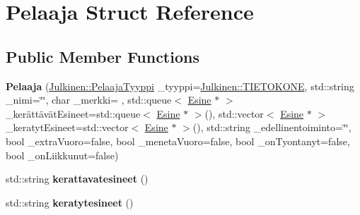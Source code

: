 \hypertarget{struct_pelaaja}{}\section{Pelaaja Struct Reference}
\label{struct_pelaaja}
\subsection*{Public Member Functions}
\begin{DoxyCompactItemize}
\item 
\hypertarget{struct_pelaaja_a278f63f50df4d765e6f0d9f7f69cb369}{}{\bfseries Pelaaja} (\hyperlink{namespace_julkinen_ad9a0a9e01af78249f584a93b03db4329}{Julkinen\+::\+Pelaaja\+Tyyppi} \+\_\+tyyppi=\hyperlink{namespace_julkinen_ad9a0a9e01af78249f584a93b03db4329a72363d3abdcf0ff5a5318785a7d18363}{Julkinen\+::\+T\+I\+E\+T\+O\+K\+O\+N\+E}, std\+::string \+\_\+nimi=\char`\"{}\char`\"{}, char \+\_\+merkki= \textquotesingle{} \textquotesingle{}, std\+::queue$<$ \hyperlink{struct_esine}{Esine} $\ast$ $>$ \+\_\+kerättävät\+Esineet=std\+::queue$<$ \hyperlink{struct_esine}{Esine} $\ast$ $>$(), std\+::vector$<$ \hyperlink{struct_esine}{Esine} $\ast$ $>$ \+\_\+keratyt\+Esineet=std\+::vector$<$ \hyperlink{struct_esine}{Esine} $\ast$ $>$(), std\+::string \+\_\+edellinentoiminto=\char`\"{}\char`\"{}, bool \+\_\+extra\+Vuoro=false, bool \+\_\+meneta\+Vuoro=false, bool \+\_\+on\+Tyontanyt=false, bool \+\_\+on\+Liikkunut=false)\label{struct_pelaaja_a278f63f50df4d765e6f0d9f7f69cb369}

\item 
\hypertarget{struct_pelaaja_af6d71411c2fb113bc8ae3c7ae0a7c2c7}{}std\+::string {\bfseries kerattavatesineet} ()\label{struct_pelaaja_af6d71411c2fb113bc8ae3c7ae0a7c2c7}

\item 
\hypertarget{struct_pelaaja_a65501bf1a3bb406261fcde36d1810c63}{}std\+::string {\bfseries keratytesineet} ()\label{struct_pelaaja_a65501bf1a3bb406261fcde36d1810c63}

\end{DoxyCompactItemize}
